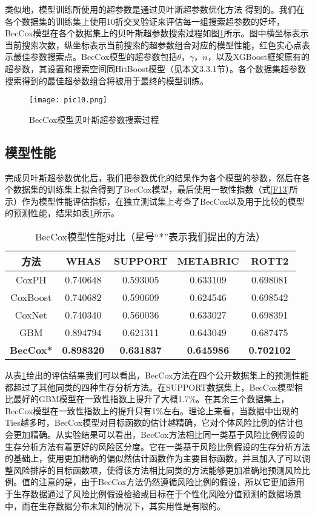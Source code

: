类似地，模型训练所使用的超参数是通过贝叶斯超参数优化方法 得到的。我们在各个数据集的训练集上使用10折交叉验证来评估每一组搜索超参数的好坏，BecCox模型在各个数据集上的贝叶斯超参数搜索过程如图\ref{pic10}所示。图中横坐标表示当前搜索次数，纵坐标表示当前搜索的超参数组合对应的模型性能，红色实心点表示最佳参数搜索点。BecCox模型的超参数包括$\theta$，$\gamma$，$n$，以及XGBoost框架原有的超参数，其设置和搜索空间同HitBoost模型（见本文3.3.1节）。各个数据集超参数搜索得到的最佳超参数组合将被用于最终的模型训练。

\begin{figure}[H]
\texttt{[image: pic10.png]}
\caption{BecCox模型贝叶斯超参数搜索过程}
\label{pic10}
\end{figure}

\subsection{模型性能}

完成贝叶斯超参数优化后，我们把参数优化的结果作为各个模型的参数，然后在各个数据集的训练集上拟合得到了BecCox模型，最后使用一致性指数（式\eqref{F13}所示）作为模型性能评估指标，在独立测试集上考查了BecCox以及用于比较的模型的预测性能，结果如表\ref{table05}所示。

\begin{table}[h]
\caption{BecCox模型性能对比（星号“*”表示我们提出的方法）}
\begin{tabular}{ccccc}
\toprule
方法 & WHAS & SUPPORT & METABRIC & ROTT2 \\ 
\midrule
CoxPH & 0.740648 & 0.593005 & 0.633109 & 0.698081 \\
CoxBoost & 0.740682 & 0.590609 & 0.624546 & 0.698542 \\
CoxNet & 0.740340 & 0.560036 & 0.633027 & 0.698391 \\
GBM & 0.894794 & 0.621311 & 0.643049 & 0.687475 \\
\textbf{BecCox*} & \textbf{0.898320} & \textbf{0.631837} & \textbf{0.645986} & \textbf{0.702102} \\
\bottomrule
\end{tabular}
\label{table05}
\end{table}

从表\ref{table05}给出的评估结果我们可以看出，BecCox方法在四个公开数据集上的预测性能都超过了其他同类的四种生存分析方法。在SUPPORT数据集上，BecCox模型相比最好的GBM模型在一致性指数上提升了大概1.7\%。在其余三个数据集上，BecCox模型在一致性指数上的提升只有1\%左右。理论上来看，当数据中出现的Ties越多时，BecCox模型对目标函数的估计越精确，它对个体风险比例的估计也会更加精确。从实验结果可以看出，BecCox方法相比同一类基于风险比例假设的生存分析方法有着更好的风险区分度。它在一类基于风险比例假设的生存分析方法的基础上，使用更加精确的偏似然估计函数作为主要目标函数，并且加入了可以调整风险排序的目标函数项，使得该方法相比同类的方法能够更加准确地预测风险比例。值的注意的是，由于BecCox方法仍然遵循风险比例的假设，所以它更加适用于生存数据通过了风险比例假设检验或目标在于个性化风险分值预测的数据场景中，而在生存数据分布未知的情况下，其实用性是有限的。

